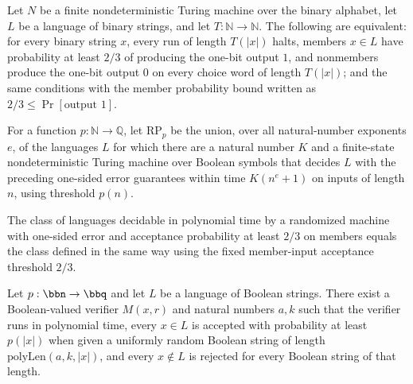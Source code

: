\begin{theorem}
\label{Turing.FinNDTM.rDecidesInTime_iff}
\leanok
{}
Let $N$ be a finite nondeterministic Turing machine over the binary alphabet, let $L$ be
a language of binary strings, and let $T:\mathbb{N}\to\mathbb{N}$. The following are
equivalent: for every binary string $x$, every run of length $T(|x|)$ halts, members
$x\in L$ have probability at least $2/3$ of producing the one-bit output $1$, and
nonmembers produce the one-bit output $0$ on every choice word of length $T(|x|)$; and
the same conditions with the member probability bound written as $2/3\leq
\Pr[\text{output }1]$.
\end{theorem}

\begin{definition}
\label{Randomized.RP_PTMWith}
\leanok
{}
For a function $p:\mathbb{N}\to\mathbb{Q}$, let $\mathrm{RP}_{p}$ be the union, over all
natural-number exponents $e$, of the languages $L$ for which there are a natural
number $K$ and a finite-state nondeterministic Turing machine over Boolean symbols
that decides $L$ with the preceding one-sided error guarantees within time
$K(n^e+1)$ on inputs of length $n$, using threshold $p(n)$.
\end{definition}

\begin{theorem}
\label{Randomized.RP_PTM_eq_RP_PTMWith}
\leanok
{}
The class of languages decidable in polynomial time by a randomized machine with
one-sided error and acceptance probability at least $2/3$ on members equals the class
defined in the same way using the fixed member-input acceptance threshold $2/3$.
\end{theorem}

\begin{definition}
\label{Randomized.InRPWith}
\leanok
{}
Let $p:\bbn\to\bbq$ and let $L$ be a language of Boolean strings. There exist a
Boolean-valued verifier $M(x,r)$ and natural numbers $a,k$ such that the verifier runs
in polynomial time, every $x\in L$ is accepted with probability at least $p(|x|)$ when
given a uniformly random Boolean string of length $\mathrm{polyLen}(a,k,|x|)$, and every
$x\notin L$ is rejected for every Boolean string of that length.
\end{definition}

